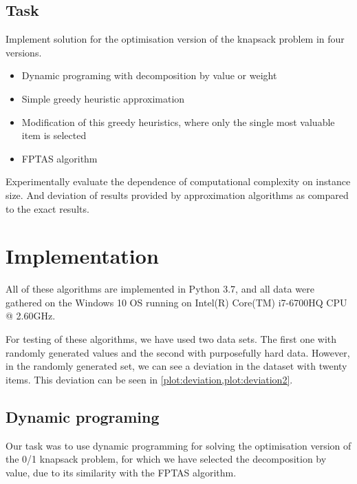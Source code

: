 \subsection{Task}
Implement solution for the optimisation version of the knapsack problem in four versions.

\begin{itemize}
    \item Dynamic programing with decomposition by value or weight
    \item Simple greedy heuristic approximation
    \item Modification of this greedy heuristics, where only the single most valuable item is selected
    \item FPTAS algorithm
\end{itemize}

Experimentally evaluate the dependence of computational complexity on instance size. And deviation of results provided by approximation algorithms as compared to the exact results. 



% 



% 

% 


\section{Implementation}
All of these algorithms are implemented in Python 3.7, and all data were gathered on the Windows 10 OS running on Intel(R) Core(TM) i7-6700HQ CPU @ 2.60GHz.

For testing of these algorithms, we have used two data sets. The first one with randomly generated values and the second with purposefully hard data. However, in the randomly generated set, we can see a deviation in the dataset with twenty items. This deviation can be seen in \cref{plot:deviation,plot:deviation2}.

\subsection{Dynamic programing}
Our task was to use dynamic programming for solving the optimisation version of the 0/1 knapsack problem, for which we have selected the decomposition by value, due to its similarity with the FPTAS algorithm.

